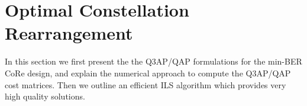 \documentclass[conference]{IEEEtran}
\begin{document}
%



\section{Optimal Constellation Rearrangement}
\label{sec:core}
In this section we first present the the Q3AP/QAP formulations for the min-BER
CoRe design, and explain the numerical approach to compute the Q3AP/QAP cost
matrices. Then we outline an efficient ILS algorithm which provides very high
quality solutions.
\end{document}
